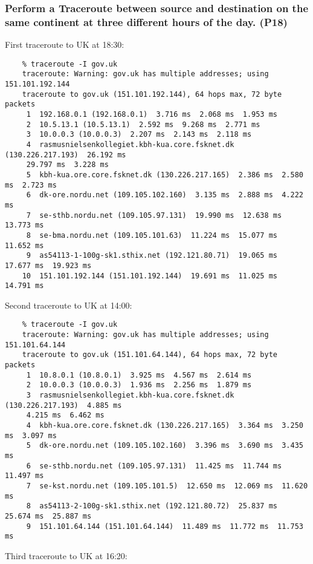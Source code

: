 \subsubsection{Perform a Traceroute between source and destination on the same continent at three different hours of the day. (P18)}
First traceroute to UK at 18:30:
\begin{verbatim}
    % traceroute -I gov.uk         
    traceroute: Warning: gov.uk has multiple addresses; using 151.101.192.144
    traceroute to gov.uk (151.101.192.144), 64 hops max, 72 byte packets
     1  192.168.0.1 (192.168.0.1)  3.716 ms  2.068 ms  1.953 ms
     2  10.5.13.1 (10.5.13.1)  2.592 ms  9.268 ms  2.771 ms
     3  10.0.0.3 (10.0.0.3)  2.207 ms  2.143 ms  2.118 ms
     4  rasmusnielsenkollegiet.kbh-kua.core.fsknet.dk (130.226.217.193)  26.192 ms  
     29.797 ms  3.228 ms
     5  kbh-kua.ore.core.fsknet.dk (130.226.217.165)  2.386 ms  2.580 ms  2.723 ms
     6  dk-ore.nordu.net (109.105.102.160)  3.135 ms  2.888 ms  4.222 ms
     7  se-sthb.nordu.net (109.105.97.131)  19.990 ms  12.638 ms  13.773 ms
     8  se-bma.nordu.net (109.105.101.63)  11.224 ms  15.077 ms  11.652 ms
     9  as54113-1-100g-sk1.sthix.net (192.121.80.71)  19.065 ms  17.677 ms  19.923 ms
    10  151.101.192.144 (151.101.192.144)  19.691 ms  11.025 ms  14.791 ms
\end{verbatim}
Second traceroute to UK at 14:00:
\begin{verbatim}
    % traceroute -I gov.uk
    traceroute: Warning: gov.uk has multiple addresses; using 151.101.64.144
    traceroute to gov.uk (151.101.64.144), 64 hops max, 72 byte packets
     1  10.8.0.1 (10.8.0.1)  3.925 ms  4.567 ms  2.614 ms
     2  10.0.0.3 (10.0.0.3)  1.936 ms  2.256 ms  1.879 ms
     3  rasmusnielsenkollegiet.kbh-kua.core.fsknet.dk (130.226.217.193)  4.885 ms  
     4.215 ms  6.462 ms
     4  kbh-kua.ore.core.fsknet.dk (130.226.217.165)  3.364 ms  3.250 ms  3.097 ms
     5  dk-ore.nordu.net (109.105.102.160)  3.396 ms  3.690 ms  3.435 ms
     6  se-sthb.nordu.net (109.105.97.131)  11.425 ms  11.744 ms  11.497 ms
     7  se-kst.nordu.net (109.105.101.5)  12.650 ms  12.069 ms  11.620 ms
     8  as54113-2-100g-sk1.sthix.net (192.121.80.72)  25.837 ms  25.674 ms  25.887 ms
     9  151.101.64.144 (151.101.64.144)  11.489 ms  11.772 ms  11.753 ms
\end{verbatim}
Third traceroute to UK at 16:20:
